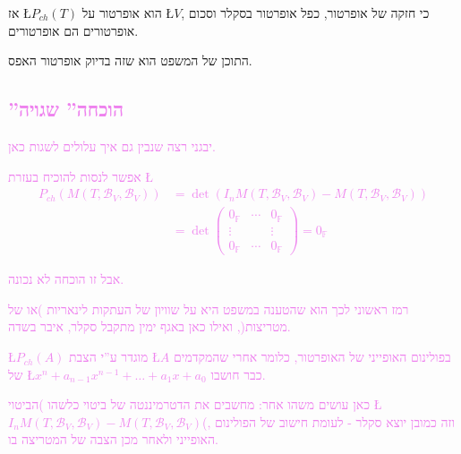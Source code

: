 \documentclass[english,hebrew]{article}
\begin{document}
\medskip{}

אז \L{$P_{ch}(T)$} הוא אופרטור על \L{$V$}, כי חזקה של אופרטור, כפל
אופרטור בסקלר וסכום אופרטורים הם אופרטורים. 

התוכן של המשפט הוא שזה בדיוק אופרטור האפס.

\subsection{\textcolor{violet}{\textquotedblright הוכחה\textquotedblright{} שגויה}}

\textcolor{violet}{יבגני רצה שנבין גם איך עלולים לשגות כאן.}

\textcolor{violet}{אפשר לנסות להוכיח בעזרת \L{%
\begin{align*}
P_{ch}\left(M(T,\mathcal{B}_{V},\mathcal{B}_{V})\right) & =\det\left(I_{n}M(T,\mathcal{B}_{V},\mathcal{B}_{V})-M(T,\mathcal{B}_{V},\mathcal{B}_{V})\right)\\
 & =\det\begin{pmatrix}0_{\mathbb{F}} & \cdots & 0_{\mathbb{F}}\\
\vdots &  & \vdots\\
0_{\mathbb{F}} & \cdots & 0_{\mathbb{F}}
\end{pmatrix}=0_{\mathbb{F}}
\end{align*}
}%
}

\textcolor{violet}{אבל זו הוכחה לא נכונה.}

\textcolor{violet}{רמז ראשוני לכך הוא שהטענה במשפט היא על שוויון של
העתקות לינאריות )או של מטריצות(, ואילו כאן באגף ימין מתקבל סקלר, איבר
בשדה.}

\textcolor{violet}{\L{$P_{ch}(A)$} מוגדר ע\textquotedblright י הצבת
\L{$A$} בפולינום האופייני של האופרטור, כלומר אחרי שהמקדמים של \L{$x^{n}+a_{n-1}x^{n-1}+\dots+a_{1}x+a_{0}$}
כבר חושבו.}

\textcolor{violet}{כאן עושים משהו אחר: מחשבים את הדטרמיננטה של ביטוי
כלשהו )הביטוי \L{$I_{n}M(T,\mathcal{B}_{V},\mathcal{B}_{V})-M(T,\mathcal{B}_{V},\mathcal{B}_{V})$}(,
וזה כמובן יוצא סקלר - לעומת חישוב של הפולינום האופייני ולאחר מכן הצבה
של המטריצה בו. }
\end{document}
